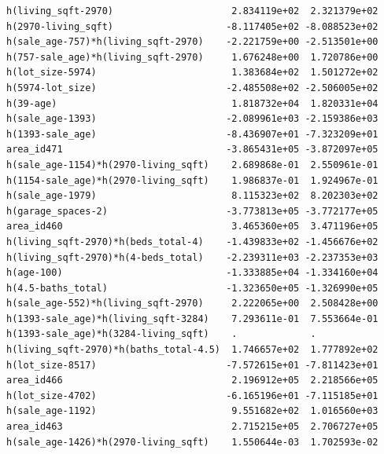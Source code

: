 \documentclass[
]{article}
\begin{document}
\begin{verbatim}
h(living_sqft-2970)                     2.834119e+02  2.321379e+02
h(2970-living_sqft)                    -8.117405e+02 -8.088523e+02
h(sale_age-757)*h(living_sqft-2970)    -2.221759e+00 -2.513501e+00
h(757-sale_age)*h(living_sqft-2970)     1.676248e+00  1.720786e+00
h(lot_size-5974)                        1.383684e+02  1.501272e+02
h(5974-lot_size)                       -2.485508e+02 -2.506005e+02
h(39-age)                               1.818732e+04  1.820331e+04
h(sale_age-1393)                       -2.089961e+03 -2.159386e+03
h(1393-sale_age)                       -8.436907e+01 -7.323209e+01
area_id471                             -3.865431e+05 -3.872097e+05
h(sale_age-1154)*h(2970-living_sqft)    2.689868e-01  2.550961e-01
h(1154-sale_age)*h(2970-living_sqft)    1.986837e-01  1.924967e-01
h(sale_age-1979)                        8.115323e+02  8.202303e+02
h(garage_spaces-2)                     -3.773813e+05 -3.772177e+05
area_id460                              3.465360e+05  3.471196e+05
h(living_sqft-2970)*h(beds_total-4)    -1.439833e+02 -1.456676e+02
h(living_sqft-2970)*h(4-beds_total)    -2.239311e+03 -2.237353e+03
h(age-100)                             -1.333885e+04 -1.334160e+04
h(4.5-baths_total)                     -1.323650e+05 -1.326990e+05
h(sale_age-552)*h(living_sqft-2970)     2.222065e+00  2.508428e+00
h(1393-sale_age)*h(living_sqft-3284)    7.293611e-01  7.553664e-01
h(1393-sale_age)*h(3284-living_sqft)    .             .           
h(living_sqft-2970)*h(baths_total-4.5)  1.746657e+02  1.777892e+02
h(lot_size-8517)                       -7.572615e+01 -7.811423e+01
area_id466                              2.196912e+05  2.218566e+05
h(lot_size-4702)                       -6.165196e+01 -7.115185e+01
h(sale_age-1192)                        9.551682e+02  1.016560e+03
area_id463                              2.715215e+05  2.706727e+05
h(sale_age-1426)*h(2970-living_sqft)    1.550644e-03  1.702593e-02
                                                                  

\end{verbatim}
\end{document}

